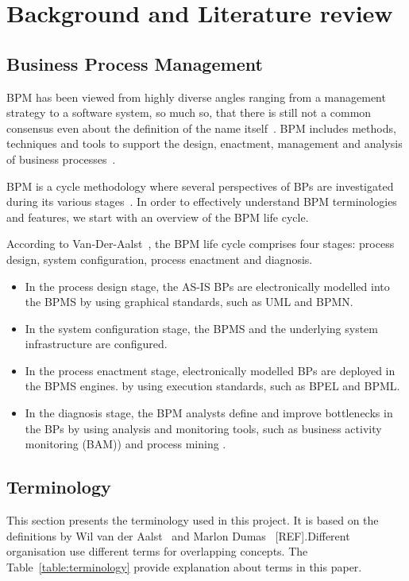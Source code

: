 \chapter{Background and Literature review}

\section{Business Process Management}

BPM has been viewed from highly diverse angles ranging from a management strategy to a software system, so much so, that there is still not a common consensus even about the definition of the name itself~\cite{van2003workflow}. BPM includes methods, techniques and tools to support the design, enactment, management and analysis of business processes~\cite{van2003workflow}.

BPM is a cycle methodology where several perspectives of BPs are investigated during its various stages~\cite{lodhi2013business}. In order to effectively understand BPM terminologies and features, we start with an overview of the BPM life cycle.

According to Van-Der-Aalst~\cite{van2003workflow}, the BPM life cycle comprises four stages: process design, system configuration, process enactment and diagnosis.
\begin{itemize}
    \item In the process design stage, the AS-IS BPs are electronically modelled into the BPMS by using graphical standards, such as UML and BPMN.
    \item In the system configuration stage, the BPMS and the underlying system infrastructure are configured. 
    \item In the process enactment stage, electronically modelled BPs are deployed in the BPMS engines. by using execution standards, such as BPEL and BPML.
    \item In the diagnosis stage, the BPM analysts define and improve bottlenecks in the BPs by using analysis and monitoring tools, such as business activity monitoring (BAM)) and process mining .
\end{itemize}

\section{Terminology}


This section presents the terminology used in this project.
It is based on the definitions by Wil van der Aalst~\cite{Aalst2013} and Marlon Dumas~\cite{dumasFundamentalsBusinessProcess2018} [REF].Different organisation use different terms for overlapping concepts. The Table~\ref{table:terminology} provide explanation about terms in this paper.

